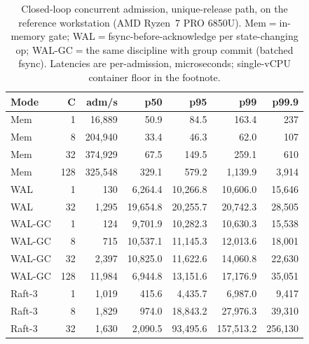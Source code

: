 \documentclass[10pt,journal,compsoc]{IEEEtran}
\newcommand{\CPUMODEL}{AMD Ryzen~7 PRO 6850U}
\begin{document}
\begin{table}[!t]
\centering
\caption{Closed-loop concurrent admission, unique-release path, on the
reference workstation (\CPUMODEL{}). Mem${=}$in-memory gate;
WAL${=}$fsync-before-acknowledge per state-changing op;
WAL-GC${=}$the same discipline with group commit (batched fsync). Latencies
are per-admission, microseconds; single-vCPU container floor in the
footnote.}
\label{tab:load}
\renewcommand{\arraystretch}{1.2}
\setlength{\tabcolsep}{3.2pt}
\scriptsize
\begin{tabular}{@{}lrrrrrr@{}}
\toprule
\textbf{Mode} & \textbf{C} & \textbf{adm/s} & \textbf{p50} & \textbf{p95} & \textbf{p99} & \textbf{p99.9}\\
\midrule
Mem & 1   & 16{,}889  & 50.9   & 84.5   & 163.4   & 237\\
Mem & 8   & 204{,}940 & 33.4   & 46.3   & 62.0    & 107\\
Mem & 32  & 374{,}929 & 67.5   & 149.5  & 259.1   & 610\\
Mem & 128 & 325{,}548 & 329.1  & 579.2  & 1{,}139.9 & 3{,}914\\
WAL & 1   & 130       & 6{,}264.4 & 10{,}266.8 & 10{,}606.0 & 15{,}646\\
WAL & 32  & 1{,}295   & 19{,}654.8 & 20{,}255.7 & 20{,}742.3 & 28{,}505\\
WAL-GC & 1   & 124     & 9{,}701.9 & 10{,}282.3 & 10{,}630.3 & 15{,}538\\
WAL-GC & 8   & 715     & 10{,}537.1 & 11{,}145.3 & 12{,}013.6 & 18{,}001\\
WAL-GC & 32  & 2{,}397 & 10{,}825.0 & 11{,}622.6 & 14{,}060.8 & 22{,}630\\
WAL-GC & 128 & 11{,}984 & 6{,}944.8 & 13{,}151.6 & 17{,}176.9 & 35{,}051\\
\midrule
Raft-3 & 1   & 1{,}019  & 415.6    & 4{,}435.7  & 6{,}987.0   & 9{,}417\\
Raft-3 & 8   & 1{,}829  & 974.0    & 18{,}843.2 & 27{,}976.3  & 39{,}310\\
Raft-3 & 32  & 1{,}630  & 2{,}090.5 & 93{,}495.6 & 157{,}513.2 & 256{,}130\\
\bottomrule
\end{tabular}
\end{table}
\end{document}
